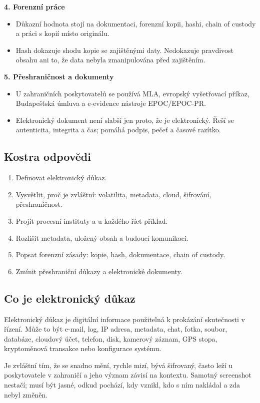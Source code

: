 \documentclass[11pt,a4paper]{article}
\begin{document}
\textbf{4. Forenzní práce}
\begin{itemize}
  \item Důkazní hodnota stojí na dokumentaci, forenzní kopii, hashi, chain of custody a práci s kopií místo originálu.
  \item Hash dokazuje shodu kopie se zajištěnými daty. Nedokazuje pravdivost obsahu ani to, že data nebyla zmanipulována před zajištěním.
\end{itemize}

\textbf{5. Přeshraničnost a dokumenty}
\begin{itemize}
  \item U zahraničních poskytovatelů se používá MLA, evropský vyšetřovací příkaz, Budapešťská úmluva a e-evidence nástroje EPOC/EPOC-PR.
  \item Elektronický dokument není slabší jen proto, že je elektronický. Řeší se autenticita, integrita a čas; pomáhá podpis, pečeť a časové razítko.
\end{itemize}

\subsection*{Kostra odpovědi}
\begin{enumerate}
  \item Definovat elektronický důkaz.
  \item Vysvětlit, proč je zvláštní: volatilita, metadata, cloud, šifrování, přeshraničnost.
  \item Projít procesní instituty a u každého říct příklad.
  \item Rozlišit metadata, uložený obsah a budoucí komunikaci.
  \item Popsat forenzní zásady: kopie, hash, dokumentace, chain of custody.
  \item Zmínit přeshraniční důkazy a elektronické dokumenty.
\end{enumerate}

\subsection*{Co je elektronický důkaz}
Elektronický důkaz je digitální informace použitelná k prokázání skutečnosti v řízení. Může to být e-mail, log, IP adresa, metadata, chat, fotka, soubor, databáze, cloudový účet, telefon, disk, kamerový záznam, GPS stopa, kryptoměnová transakce nebo konfigurace systému.

Je zvláštní tím, že se snadno mění, rychle mizí, bývá šifrovaný, často leží u poskytovatele v zahraničí a jeho význam závisí na kontextu. Samotný screenshot nestačí; musí být jasné, odkud pochází, kdy vznikl, kdo s ním nakládal a zda nebyl změněn.
\end{document}
